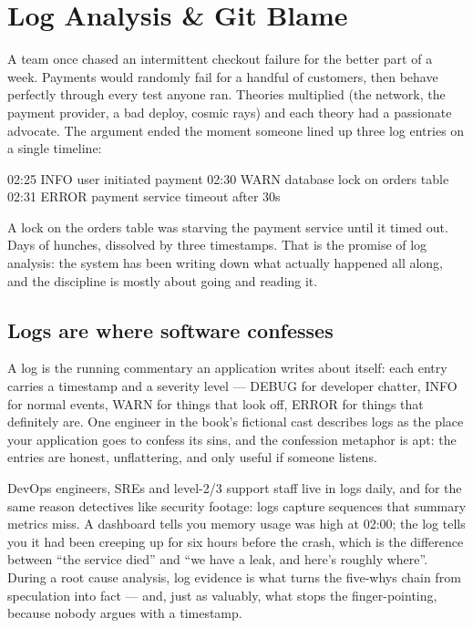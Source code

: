 \section{Log Analysis \& Git Blame}
A team once chased an intermittent checkout failure for the better part of a week. Payments would randomly fail for a handful of customers, then behave perfectly through every test anyone ran. Theories multiplied (the network, the payment provider, a bad deploy, cosmic rays) and each theory had a passionate advocate. The argument ended the moment someone lined up three log entries on a single timeline:



\begin{CodeBlock}
02:25 INFO  user initiated payment
02:30 WARN  database lock on orders table
02:31 ERROR payment service timeout after 30s
\end{CodeBlock}


A lock on the orders table was starving the payment service until it timed out. Days of hunches, dissolved by three timestamps. That is the promise of log analysis: the system has been writing down what actually happened all along, and the discipline is mostly about going and reading it.



\subsection{Logs are where software confesses}


A log is the running commentary an application writes about itself: each entry carries a timestamp and a severity level — DEBUG for developer chatter, INFO for normal events, WARN for things that look off, ERROR for things that definitely are. One engineer in the book's fictional cast describes logs as the place your application goes to confess its sins, and the confession metaphor is apt: the entries are honest, unflattering, and only useful if someone listens.


DevOps engineers, SREs and level-2/3 support staff live in logs daily, and for the same reason detectives like security footage: logs capture sequences that summary metrics miss. A dashboard tells you memory usage was high at 02:00; the log tells you it had been creeping up for six hours before the crash, which is the difference between ``the service died'' and ``we have a leak, and here's roughly where''. During a root cause analysis, log evidence is what turns the five-whys chain from speculation into fact — and, just as valuably, what stops the finger-pointing, because nobody argues with a timestamp.


